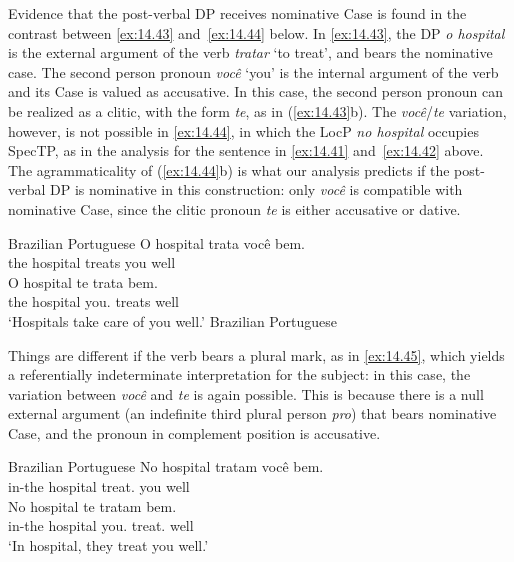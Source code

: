 \documentclass[output=paper]{langsci/langscibook}
\begin{document}
Evidence that the post-verbal DP receives nominative Case is found in the
contrast between \eqref{ex:14.43} and~\eqref{ex:14.44} below. In
\eqref{ex:14.43}, the DP \emph{o hospital} is the external argument of the
verb \emph{tratar} ‘to treat’, and bears the nominative case. The second person
pronoun \emph{você} ‘you’ is the internal argument of the verb and its Case is
valued as accusative. In this case, the second person pronoun can be realized
as a clitic, with the form \emph{te}, as in (\ref{ex:14.43}b). The
\emph{você}/\emph{te} variation, however, is not possible in
\eqref{ex:14.44}, in which the LocP \emph{no hospital} occupies SpecTP, as
in the analysis for the sentence in \eqref{ex:14.41}
and~\eqref{ex:14.42} above. The agrammaticality of (\ref{ex:14.44}b) is
what our analysis predicts if the post-verbal DP is nominative in this
construction: only \emph{você} is compatible with nominative Case, since the
clitic pronoun \emph{te} is either accusative or dative.\largerpage[1]

\ea\label{ex:14.43}Brazilian Portuguese
    \ea
    \gll    O hospital trata você bem.\\
            the hospital treats you well\\
    \ex
    \gll    O hospital te trata bem.\\
            the hospital you.\Acc{} treats well\\
    \glt    ‘Hospitals take care of you well.’
    \z
\ex\label{ex:14.44}Brazilian Portuguese
    \z
\z

Things are different if the verb bears a plural mark, as in
\eqref{ex:14.45}, which yields a referentially indeterminate interpretation
for the subject: in this case, the variation between \emph{você} and \emph{te}
is again possible. This is because there is a null external argument (an
indefinite third plural person \emph{pro}) that bears nominative Case, and the
pronoun in complement position is accusative.\largerpage[2]


\ea\label{ex:14.45}Brazilian Portuguese
    \ea
	\gll    No hospital tratam você bem.\\
            in-the hospital treat.\Tpl{} you well\\
    \ex
    \gll    No hospital te tratam bem.\\
            in-the hospital you.\Acc{} treat.\Tpl{} well\\
    \glt    ‘In hospital, they treat you well.’
    \z
\z
\end{document}
